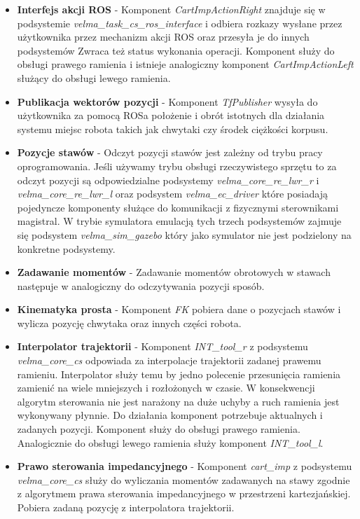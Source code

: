 	\begin{itemize}
	\item \textbf{Interfejs akcji ROS} - 
	Komponent \textit{CartImpActionRight} znajduje się w podsystemie \textit{velma\_task\_cs\_ros\_interface} i odbiera rozkazy wysłane przez użytkownika przez mechanizm akcji ROS oraz przesyła je do innych podsystemów Zwraca też status wykonania operacji. Komponent służy do obsługi prawego ramienia i istnieje analogiczny komponent \textit{CartImpActionLeft} służący do obsługi lewego ramienia.
	\item \textbf{Publikacja wektorów pozycji} - 
	Komponent \textit{TfPublisher} wysyła do użytkownika za pomocą ROSa położenie i obrót istotnych dla działania systemu miejsc robota takich jak chwytaki czy środek ciężkości korpusu. 
	\item \textbf{Pozycje stawów} - 
	Odczyt pozycji stawów jest zależny od trybu pracy oprogramowania. Jeśli używamy trybu obsługi rzeczywistego sprzętu to za odczyt pozycji są odpowiedzialne podsystemy \textit{velma\_core\_re\_lwr\_r} i \textit{velma\_core\_re\_lwr\_l} oraz podsystem \textit{velma\_ec\_driver} które posiadają pojedyncze komponenty służące do komunikacji z fizycznymi sterownikami magistral. W trybie symulatora emulacją tych trzech podsystemów zajmuje się podsystem \textit{velma\_sim\_gazebo} który jako symulator nie jest podzielony na konkretne podsystemy.
	\item \textbf{Zadawanie momentów} - 
	Zadawanie momentów obrotowych w stawach następuje w analogiczny do odczytywania pozycji sposób.
	\item \textbf{Kinematyka prosta} - 
	Komponent \textit{FK} pobiera dane o pozycjach stawów i wylicza pozycję chwytaka oraz innych części robota.
	\item \textbf{Interpolator trajektorii} - 
	Komponent \textit{INT\_tool\_r} z podsystemu \textit{velma\_core\_cs} odpowiada za interpolacje trajektorii zadanej prawemu ramieniu. Interpolator służy temu by jedno polecenie przesunięcia ramienia zamienić na wiele mniejszych i rozłożonych w czasie. W konsekwencji algorytm sterowania nie jest narażony na duże uchyby a ruch ramienia jest wykonywany płynnie. Do działania komponent potrzebuje aktualnych i zadanych pozycji. Komponent służy do obsługi prawego ramienia. Analogicznie do obsługi lewego ramienia służy komponent \textit{INT\_tool\_l}.

	\item \textbf{Prawo sterowania impedancyjnego} - 
	Komponent \textit{cart\_imp} z podsystemu \textit{velma\_core\_cs} służy do wyliczania momentów zadawanych na stawy zgodnie z algorytmem prawa sterowania impedancyjnego w przestrzeni kartezjańskiej. Pobiera zadaną pozycję z interpolatora trajektorii.
	\end{itemize}
